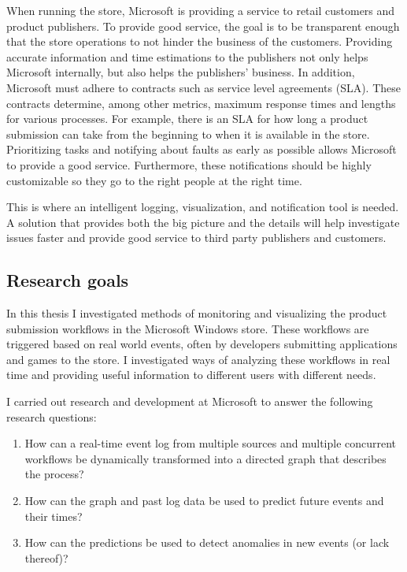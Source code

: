 \documentclass[english,12pt,a4paper,pdftex,sci,utf8]{aaltothesis}
\begin{document}
When running the store, Microsoft is providing a service to retail customers and product publishers.
To provide good service, the goal is to be transparent enough that the store operations to not hinder the
business of the customers. Providing accurate information and time estimations to the publishers
not only helps Microsoft internally, but also helps the publishers' business.
In addition, Microsoft must adhere to contracts such as
service level agreements (SLA). These contracts determine, among other metrics, 
maximum response times and lengths for various processes.
For example, there is an SLA for how long a product submission can take from the beginning to when it is available in the store.
Prioritizing tasks and notifying about faults as early as possible allows Microsoft to provide a good service. 
Furthermore, these notifications should be highly customizable so they go to the right people at the right time.

This is where an intelligent logging, visualization, and notification tool is needed. 
A solution that provides both the big picture and the details will help investigate issues faster and
provide good service to third party publishers and customers.

\subsection{Research goals}
In this thesis I investigated methods of monitoring and visualizing the product submission workflows in the Microsoft Windows store.
These workflows are triggered based on real world events, often by developers submitting applications and games to the store.
I investigated ways of analyzing these workflows in real time and providing useful information to different users with different needs. 

I carried out research and development at Microsoft to answer the following research questions:

\begin{enumerate}[label=RQ\arabic*]
    \item How can a real-time event log from multiple sources and multiple concurrent workflows be dynamically transformed into a directed graph that describes the process? 
    \item How can the graph and past log data be used to predict future events and their times?
    \item How can the predictions be used to detect anomalies in new events (or lack thereof)?
\end{enumerate}
\end{document}
